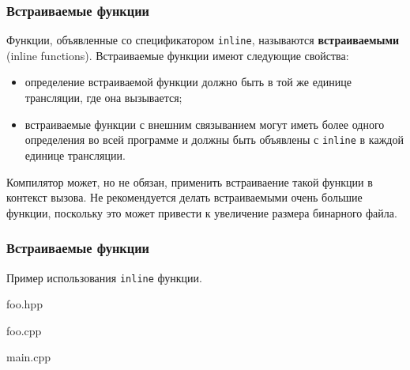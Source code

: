 \documentclass[compress, 8pt]{beamer}
\begin{document}
\begin{frame}[fragile]

    \frametitle{Встраиваемые функции}

    Функции, объявленные со спецификатором \verb|inline|\footnotemark{}, называются
    \textbf{встраиваемыми} (inline functions).
    Встраиваемые функции имеют следующие свойства:


    \begin{itemize}
        \item определение встраиваемой функции должно быть в той же единице
            трансляции, где она вызывается;
        \item встраиваемые функции с внешним связыванием могут иметь более
            одного определения во всей программе и должны быть объявлены
            с \verb|inline| в каждой единице трансляции.
    \end{itemize}

    Компилятор может, но не обязан, применить встраиваение\footnotetext{} такой
    функции в контекст вызова.
    Не рекомендуется делать встраиваемыми очень большие функции, поскольку это
    может привести к увеличение размера бинарного файла.


\end{frame}

\begin{frame}[fragile]

    \frametitle{Встраиваемые функции}

    Пример использования \verb|inline| функции.

        {foo.hpp}

        {foo.cpp}

        {main.cpp}

\end{frame}
\end{document}
